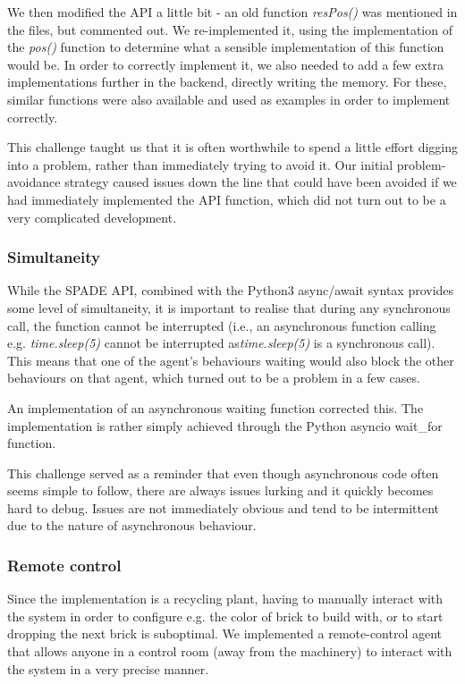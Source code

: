 \documentclass[conference]{IEEEtran}
\begin{document}
We then modified the API a little bit - an old function \emph{resPos()} was mentioned in the files, but commented out. We re-implemented it, using the implementation of the \emph{pos()} function to determine what a sensible implementation of this function would be. In order to correctly implement it, we also needed to add a few extra implementations further in the backend, directly writing the memory. For these, similar functions were also available and used as examples in order to implement correctly.

This challenge taught us that it is often worthwhile to spend a little effort digging into a problem, rather than immediately trying to avoid it. Our initial problem-avoidance strategy caused issues down the line that could have been avoided if we had immediately implemented the API function, which did not turn out to be a very complicated development.

\subsubsection{Simultaneity}

While the SPADE API, combined with the Python3 async/await syntax provides some level of simultaneity, it is important to realise that during any synchronous call, the function cannot be interrupted (i.e., an asynchronous function calling e.g. \emph{time.sleep(5)} cannot be interrupted as\emph{time.sleep(5)} is a synchronous call). This means that one of the agent's behaviours waiting would also block the other behaviours on that agent, which turned out to be a problem in a few cases.

An implementation of an asynchronous waiting function corrected this. The implementation is rather simply achieved through the Python asyncio wait_for function. 

This challenge served as a reminder that even though asynchronous code often seems simple to follow, there are always issues lurking and it quickly becomes hard to debug. Issues are not immediately obvious and tend to be intermittent due to the nature of asynchronous behaviour.

\subsubsection{Remote control}

Since the implementation is a recycling plant, having to manually interact with the system in order to configure e.g. the color of brick to build with, or to start dropping the next brick is suboptimal. We implemented a remote-control agent that allows anyone in a control room (away from the machinery) to interact with the system in a very precise manner. 
\end{document}
